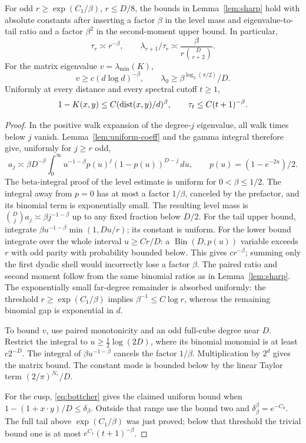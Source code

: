 \begin{lemma}\label{lem:uniform-spectrum}
For odd $r\ge\exp(C_1/\beta)$, $r\le D/8$, the bounds in
Lemma~\ref{lem:sharp} hold with absolute constants after inserting a
factor $\beta$ in the level mass and eigenvalue-to-tail ratio and a
factor $\beta^2$ in the second-moment upper bound. In particular,
\[
 \tau_r\asymp r^{-\beta},\qquad
 \lambda_{r+1}/\tau_r\asymp
       \frac{\beta}{r\binom D{r+2}}.
\]
For the matrix eigenvalue $v=\lambda_{\min}(K)$,
\[
 v\ge c(d\log d)^{-\beta},\qquad
 \lambda_0\ge\beta^{\log_2(\pi/2)}/D.
\]
Uniformly at every distance and every spectral cutoff $t\ge1$,
\[
 1-K(x,y)\le C(\operatorname{dist}(x,y)/d)^\beta,
 \qquad \tau_t\le C(t+1)^{-\beta}.
\]
\end{lemma}
\begin{proof}
In the positive walk expansion of the degree-$j$ eigenvalue, all walk
times below $j$ vanish. Lemma~\ref{lem:uniform-coeff} and the gamma
integral therefore give, uniformly for $j\ge r$ odd,
\[
 a_j\asymp\beta D^{-\beta}\int_0^\infty
 u^{-1-\beta}p(u)^j(1-p(u))^{D-j}\,du,
 \qquad p(u)=(1-e^{-2u})/2.
\]
The beta-integral proof of the level estimate is uniform for
$0<\beta\le1/2$. The integral away from $p=0$ has at most a factor
$1/\beta$, canceled by the prefactor, and its binomial term is
exponentially small. The resulting level mass is
$\binom Dj a_j\asymp\beta j^{-1-\beta}$ up to any fixed fraction below
$D/2$.
For the tail upper bound, integrate
$\beta u^{-1-\beta}\min(1,Du/r)$; its constant is uniform.
For the lower bound integrate over the whole interval $u\ge Cr/D$:
a $\operatorname{Bin}(D,p(u))$ variable exceeds $r$ with odd parity
with probability bounded below. This gives $cr^{-\beta}$; summing
only the first dyadic shell would incorrectly lose a factor $\beta$.
The paired ratio and second moment follow from the same binomial
ratios as in Lemma~\ref{lem:sharp}. The exponentially small far-degree
remainder is absorbed uniformly: the threshold
$r\ge\exp(C_1/\beta)$ implies $\beta^{-1}\le C\log r$,
whereas the remaining binomial gap is exponential in $d$.

To bound $v$, use paired monotonicity and an odd full-cube degree near
$D$. Restrict the integral to $u\ge\frac12\log(2D)$, where its binomial
monomial is at least $c2^{-D}$. The integral of
$\beta u^{-1-\beta}$ cancels the factor $1/\beta$. Multiplication by
$2^d$ gives the matrix bound. The constant mode is bounded below by
the linear Taylor term $(2/\pi)^{N_*}/D$.

For the cusp, \eqref{eq:bottcher} gives the claimed uniform bound when
$1-(1+x\cdot y)/D\le\delta_\beta$. Outside that range use the bound two
and $\delta_\beta^\beta=e^{-C_0}$. The full tail above
$\exp(C_1/\beta)$ was just proved; below that threshold the trivial
bound one is at most $e^{C_1}(t+1)^{-\beta}$.
\end{proof}

